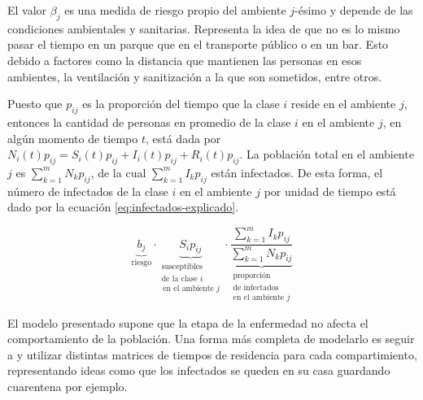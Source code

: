 El valor \(\beta_j\) es una medida de riesgo propio del ambiente \(j\)-ésimo y depende de las condiciones ambientales y sanitarias. Representa la idea de que no es lo mismo pasar el tiempo en un parque que en el transporte público o en un bar. Esto debido a factores como la distancia que mantienen las personas en esos ambientes, la ventilación y sanitización a la que son sometidos, entre otros.

Puesto que \(p_{ij}\) es la proporción del tiempo que la clase \(i\) reside en el ambiente \(j\), entonces la cantidad de personas en promedio de la clase \(i\) en el ambiente \(j\), en algún momento de tiempo \(t\), está dada por \(N_i(t) p_{ij} = S_i(t) p_{ij} + I_i(t) p_{ij} + R_i(t) p_{ij}\). La población total en el ambiente \(j\) es \(\sum_{k = 1}^m N_k p_{ij}\), de la cual \(\sum_{k = 1}^m I_k p_{ij}\) están infectados. De esta forma, el número de infectados de la clase \(i\) en el ambiente \(j\) por unidad de tiempo está dado por la ecuación \ref{eq:infectados-explicado}.

\begin{equation}\label{eq:infectados-explicado}
\underbrace{b_j}_{\text{riesgo}} \cdot \underbrace{S_i p_{ij}}_{\substack{\text{susceptibles}\\\text{de la clase } i\\ \, \text{en el ambiente } j}} \cdot \underbrace{\frac{\sum_{k = 1}^m I_k p_{ij}}{\sum_{k = 1}^m N_k p_{ij}}}_{\substack{\text{proporción}\\\text{de infectados}\\\text{en el ambiente }j}}
\end{equation}


El modelo presentado supone que la etapa de la enfermedad no afecta el comportamiento de la población. Una forma más completa de modelarlo es seguir a \cite{Bichara2018} y utilizar distintas matrices de tiempos de residencia para cada compartimiento, representando ideas como que los infectados se queden en su casa guardando cuarentena por ejemplo.




